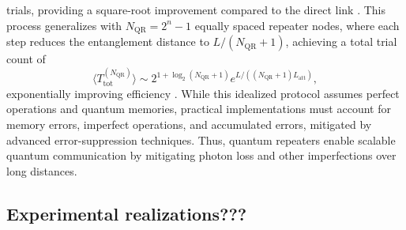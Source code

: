  trials, providing a square-root improvement compared to the direct link \cite{Azuma:2023}.
 This process generalizes with $N_{\text{QR}} = 2^n - 1$ equally spaced repeater nodes, where each step reduces the entanglement distance to $L/(N_{\text{QR}} + 1)$,
 achieving a total trial count of
 \begin{equation}
    \langle T^{(N_{\text{QR}})}_{\text{tot}} \rangle \sim 2^{1+\log_2(N_{\text{QR}} + 1)} e^{L/((N_{\text{QR}} + 1)L_{\text{att}})},
 \end{equation}
 exponentially improving efficiency \cite{Azuma:2023}. While this idealized protocol assumes perfect operations and quantum memories, practical implementations must account for memory errors,
 imperfect operations, and accumulated errors, mitigated by advanced error-suppression techniques. Thus,
 quantum repeaters enable scalable quantum communication by mitigating photon loss and other imperfections over long distances.


\subsection{Experimental realizations???}